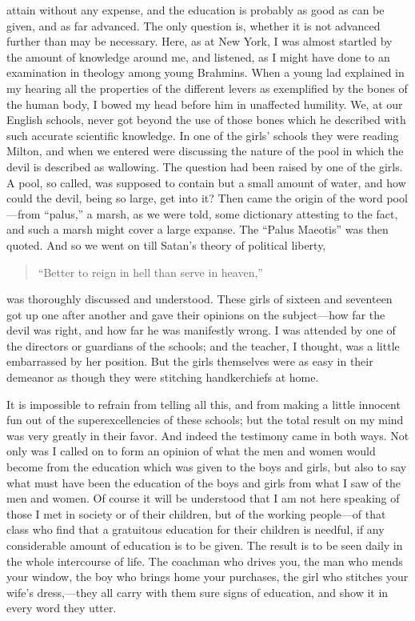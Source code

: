 attain without any expense, and the education is probably as good
as can be given, and as far advanced.  The only question is,
whether it is not advanced further than may be necessary.  Here, as
at New York, I was almost startled by the amount of knowledge
around me, and listened, as I might have done to an examination in
theology among young Brahmins.  When a young lad explained in my
hearing all the properties of the different levers as exemplified
by the bones of the human body, I bowed my head before him in
unaffected humility.  We, at our English schools, never got beyond
the use of those bones which he described with such accurate
scientific knowledge.  In one of the girls' schools they were
reading Milton, and when we entered were discussing the nature of
the pool in which the devil is described as wallowing.  The
question had been raised by one of the girls.  A pool, so called,
was supposed to contain but a small amount of water, and how could
the devil, being so large, get into it?  Then came the origin of
the word pool---from ``palus,'' a marsh, as we were told, some
dictionary attesting to the fact, and such a marsh might cover a
large expanse.  The ``Palus Maeotis'' was then quoted.  And so we
went on till Satan's theory of political liberty,

\begin{verse}
     ``Better to reign in hell than serve in heaven,''
\end{verse}

was thoroughly discussed and understood.  These girls of sixteen
and seventeen got up one after another and gave their opinions on
the subject---how far the devil was right, and how far he was
manifestly wrong.  I was attended by one of the directors or
guardians of the schools; and the teacher, I thought, was a little
embarrassed by her position.  But the girls themselves were as easy
in their demeanor as though they were stitching handkerchiefs at
home.

It is impossible to refrain from telling all this, and from making
a little innocent fun out of the superexcellencies of these
schools; but the total result on my mind was very greatly in their
favor.  And indeed the testimony came in both ways.  Not only was I
called on to form an opinion of what the men and women would become
from the education which was given to the boys and girls, but also
to say what must have been the education of the boys and girls from
what I saw of the men and women.  Of course it will be understood
that I am not here speaking of those I met in society or of their
children, but of the working people---of that class who find that a
gratuitous education for their children is needful, if any
considerable amount of education is to be given.  The result is to
be seen daily in the whole intercourse of life.  The coachman who
drives you, the man who mends your window, the boy who brings home
your purchases, the girl who stitches your wife's dress,---they all
carry with them sure signs of education, and show it in every word
they utter.

